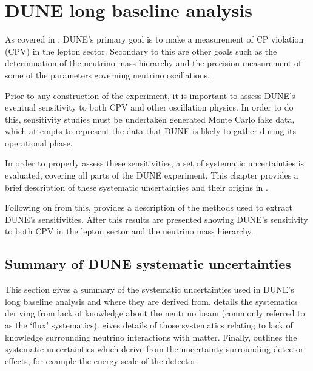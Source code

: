 \chapter{DUNE long baseline analysis}
\label{sec:dune_lbl}

As covered in , DUNE's primary goal is to make a measurement of CP violation (CPV) in the lepton sector.
Secondary to this are other goals such as the determination of the neutrino mass hierarchy and the precision measurement of some of the parameters governing neutrino oscillations.

Prior to any construction of the experiment, it is important to assess DUNE's eventual sensitivity to both CPV and other oscillation physics.
In order to do this, sensitivity studies must be undertaken generated Monte Carlo fake data, which attempts to represent the data that DUNE is likely to gather during its operational phase.

In order to properly assess these sensitivities, a set of systematic uncertainties is evaluated, covering all parts of the DUNE experiment.
This chapter provides a brief description of these systematic uncertainties and their origins in .

Following on from this,  provides a description of the methods used to extract DUNE's sensitivities.
After this results are presented showing DUNE's sensitivity to both CPV in the lepton sector and the neutrino mass hierarchy.

\section{Summary of DUNE systematic uncertainties}
\label{sec:dune_lbl:systs}

This section gives a summary of the systematic uncertainties used in DUNE's long baseline analysis and where they are derived from.
 details the systematics deriving from lack of knowledge about the neutrino beam (commonly referred to as the `flux' systematics).
 gives details of those systematics relating to lack of knowledge surrounding neutrino interactions with matter.
Finally,  outlines the systematic uncertainties which derive from the uncertainty surrounding detector effects, for example the energy scale of the detector.

